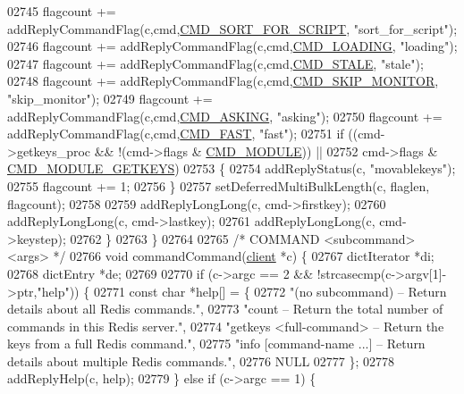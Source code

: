 \begin{DoxyCode}
{{{{{{{{{{{{{{{{{{{{{{{{{{{{{{{{{{02745         flagcount += addReplyCommandFlag(c,cmd,\hyperlink{server_8h_a819ad39aa4aef302c4421c3cd910252d}{CMD\_SORT\_FOR\_SCRIPT},\textcolor{stringliteral}{
      "sort\_for\_script"});
02746         flagcount += addReplyCommandFlag(c,cmd,\hyperlink{server_8h_a5327d118cf467e77d8bb0cebdce3c0ce}{CMD\_LOADING}, \textcolor{stringliteral}{"loading"});
02747         flagcount += addReplyCommandFlag(c,cmd,\hyperlink{server_8h_acf1f58ff0b6790cd8d0e3edf1a7e599f}{CMD\_STALE}, \textcolor{stringliteral}{"stale"});
02748         flagcount += addReplyCommandFlag(c,cmd,\hyperlink{server_8h_a43e2aecb49a88a6cd4e56bfa971bdc71}{CMD\_SKIP\_MONITOR}, \textcolor{stringliteral}{"skip\_monitor"});
02749         flagcount += addReplyCommandFlag(c,cmd,\hyperlink{server_8h_af0b13ef0f1dabe404fd7d904cb66b548}{CMD\_ASKING}, \textcolor{stringliteral}{"asking"});
02750         flagcount += addReplyCommandFlag(c,cmd,\hyperlink{server_8h_ae21dc0d9c0dcdefa14ca1054c48f252f}{CMD\_FAST}, \textcolor{stringliteral}{"fast"});
02751         \textcolor{keywordflow}{if} ((cmd->getkeys\_proc && !(cmd->flags & \hyperlink{server_8h_accabd32f20281543986166c219124f9e}{CMD\_MODULE})) ||
02752             cmd->flags & \hyperlink{server_8h_a612a8681d1a25cd86faf4139d161316a}{CMD\_MODULE\_GETKEYS})
02753         \{
02754             addReplyStatus(c, \textcolor{stringliteral}{"movablekeys"});
02755             flagcount += 1;
02756         \}
02757         setDeferredMultiBulkLength(c, flaglen, flagcount);
02758 
02759         addReplyLongLong(c, cmd->firstkey);
02760         addReplyLongLong(c, cmd->lastkey);
02761         addReplyLongLong(c, cmd->keystep);
02762     \}
02763 \}
02764 
02765 \textcolor{comment}{/* COMMAND <subcommand> <args> */}
02766 \textcolor{keywordtype}{void} commandCommand(\hyperlink{structclient}{client} *c) \{
02767     dictIterator *di;
02768     dictEntry *de;
02769 
02770     \textcolor{keywordflow}{if} (c->argc == 2 && !strcasecmp(c->argv[1]->ptr,\textcolor{stringliteral}{"help"})) \{
02771         \textcolor{keyword}{const} \textcolor{keywordtype}{char} *help[] = \{
02772 \textcolor{stringliteral}{"(no subcommand) -- Return details about all Redis commands."},
02773 \textcolor{stringliteral}{"count -- Return the total number of commands in this Redis server."},
02774 \textcolor{stringliteral}{"getkeys <full-command> -- Return the keys from a full Redis command."},
02775 \textcolor{stringliteral}{"info [command-name ...] -- Return details about multiple Redis commands."},
02776 NULL
02777         \};
02778         addReplyHelp(c, help);
02779     \} \textcolor{keywordflow}{else} \textcolor{keywordflow}{if} (c->argc == 1) \{
}}}}}}}}}}}}}}}}}}}}}}}}}}}}}}}}}}
\end{DoxyCode}
